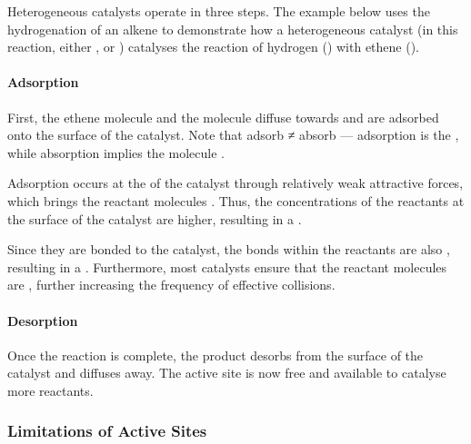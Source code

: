				Heterogeneous catalysts operate in three steps. The example below uses the hydrogenation of an alkene to demonstrate how a
				heterogeneous catalyst (in this reaction, either ,  or ) catalyses the reaction of
				hydrogen () with ethene ().


				\paragraph{Adsorption}

				First, the ethene molecule and the  molecule diffuse towards and are adsorbed onto the surface of the catalyst.
				Note that adsorb ≠ absorb --- adsorption is the , while absorption implies the molecule .

				Adsorption occurs at the  of the catalyst through relatively weak attractive forces, which brings
				the reactant molecules . Thus, the concentrations of the reactants at the surface of the catalyst
				are higher, resulting in a .

				Since they are bonded to the catalyst, the bonds within the reactants are also , resulting in a
				. Furthermore, most catalysts ensure that the reactant molecules are
				, further increasing the frequency of effective collisions.



				\paragraph{Desorption}

				Once the reaction is complete, the product desorbs from the surface of the catalyst and diffuses away. The active site is now
				free and available to catalyse more reactants.




			\subsubsection{Limitations of Active Sites}


